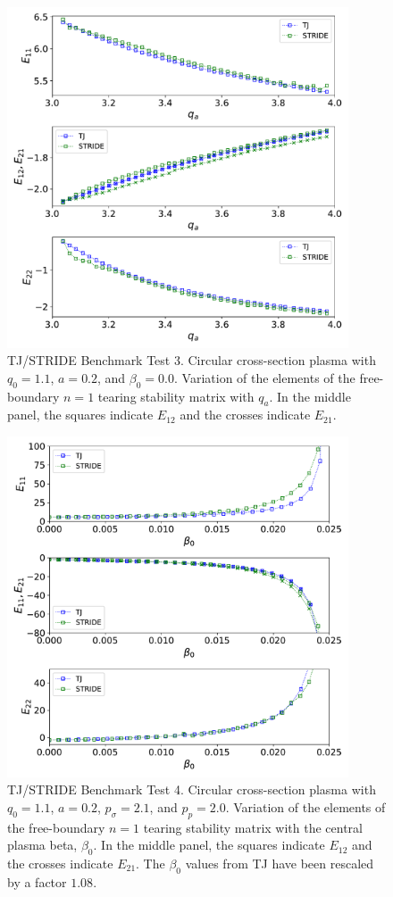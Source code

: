 \documentclass[12pt,prb,aps]{revtex4-1}
\begin{document}
\begin{figure}
\centerline{\includegraphics[width=0.9\textwidth]{Fig3.pdf}}
\caption{TJ/STRIDE Benchmark Test 3. Circular cross-section plasma with $q_0=1.1$, $a=0.2$, and $\beta_0=0.0$. Variation of the elements of the free-boundary $n=1$ tearing stability matrix with $q_a$. In the middle panel, the squares
indicate  $E_{12}$ and the crosses indicate $E_{21}$. \label{fig3}}
\end{figure}

\begin{figure}
\centerline{\includegraphics[width=0.9\textwidth]{Fig4.pdf}}
\caption{TJ/STRIDE Benchmark Test 4. Circular cross-section plasma with $q_0=1.1$, $a=0.2$, $p_\sigma=2.1$,  and $p_p=2.0$. Variation of the elements of the free-boundary $n=1$ tearing stability matrix with the central plasma beta,  $\beta_0$. In the middle panel, the squares
indicate  $E_{12}$ and the crosses indicate $E_{21}$. The $\beta_0$ values from TJ have  been rescaled by a factor $1.08$.\label{fig4}}
\end{figure}
\end{document}
